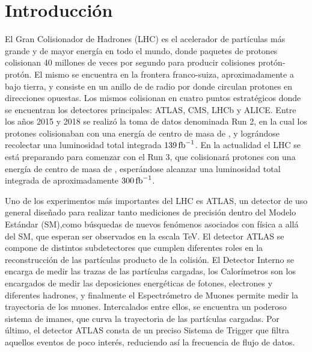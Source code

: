 \chapter*{Introducción}

El Gran Colisionador de Hadrones (LHC) es el acelerador de partículas más grande y de mayor energía en todo el mundo, donde paquetes de protones colisionan 40 millones de veces por segundo para producir colisiones protón-protón. El mismo se encuentra en la frontera franco-suiza, aproximadamente a  bajo tierra, y consiste en un anillo de  de radio por donde circulan protones en direcciones opuestas. Los mismos colisionan en cuatro puntos estratégicos donde se encuentran los detectores principales: ATLAS, CMS, LHCb y ALICE.
Entre los años 2015 y 2018 se realizó la toma de datos denominada Run 2, en la cual los protones colisionaban con una energía de centro de masa de , y lográndose recolectar una luminosidad total integrada $139\,\text{fb}^{-1}$. En la actualidad el LHC se está preparando para comenzar con el Run 3, que colisionará protones con una energía de centro de masa de , esperándose alcanzar una luminosidad total integrada de aproximadamente $300\,\text{fb}^{-1}$.

Uno de los experimentos más importantes del LHC es ATLAS, un detector de uso general diseñado para realizar tanto mediciones de precisión dentro del Modelo Estándar (SM),como búsquedas de nuevos fenómenos asociados con física a allá del SM, que esperan ser observados en la escala TeV. El detector ATLAS se compone de distintos subdetectores que cumplen diferentes roles en la reconstrucción de las partículas producto de la colisión. El Detector Interno se encarga de medir las trazas de las partículas cargadas, los Calorímetros son los encargados de medir las deposiciones energéticas de fotones, electrones y diferentes hadrones, y finalmente el Espectrómetro de Muones permite medir la trayectoria de los muones. Intercalados entre ellos, se encuentra un poderoso sistema de imanes, que curva la trayectoria de las partículas cargadas. Por último, el detector ATLAS consta de un preciso Sistema de Trigger que filtra aquellos eventos de poco interés, reduciendo así la frecuencia de flujo de datos.



